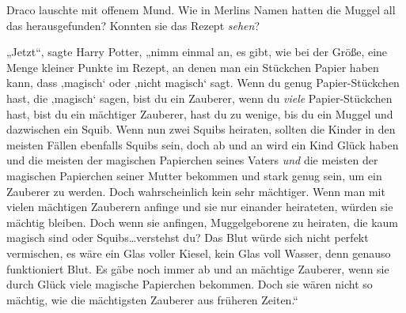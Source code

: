 Draco lauschte mit offenem Mund. Wie in Merlins Namen hatten die Muggel all das herausgefunden? Konnten sie das Rezept \emph{sehen}?

„Jetzt“, sagte Harry Potter, „nimm einmal an, es gibt, wie bei der Größe, eine Menge kleiner Punkte im Rezept, an denen man ein Stückchen Papier haben kann, dass ‚magisch‘ oder ‚nicht magisch‘ sagt. Wenn du genug Papier-Stückchen hast, die ‚magisch‘ sagen, bist du ein Zauberer, wenn du \emph{viele} Papier-Stückchen hast, bist du ein mächtiger Zauberer, hast du zu wenige, bis du ein Muggel und dazwischen ein Squib. Wenn nun zwei Squibs heiraten, sollten die Kinder in den meisten Fällen ebenfalls Squibs sein, doch ab und an wird ein Kind Glück haben und die meisten der magischen Papierchen seines Vaters \emph{und} die meisten der magischen Papierchen seiner Mutter bekommen und stark genug sein, um ein Zauberer zu werden. Doch wahrscheinlich kein sehr mächtiger. Wenn man mit vielen mächtigen Zauberern anfinge und sie nur einander heirateten, würden sie mächtig bleiben. Doch wenn sie anfingen, Muggelgeborene zu heiraten, die kaum magisch sind oder Squibs…verstehst du? Das Blut würde sich nicht perfekt vermischen, es wäre ein Glas voller Kiesel, kein Glas voll Wasser, denn genauso funktioniert Blut. Es gäbe noch immer ab und an mächtige Zauberer, wenn sie durch Glück viele magische Papierchen bekommen. Doch sie wären nicht so mächtig, wie die mächtigsten Zauberer aus früheren Zeiten.“

